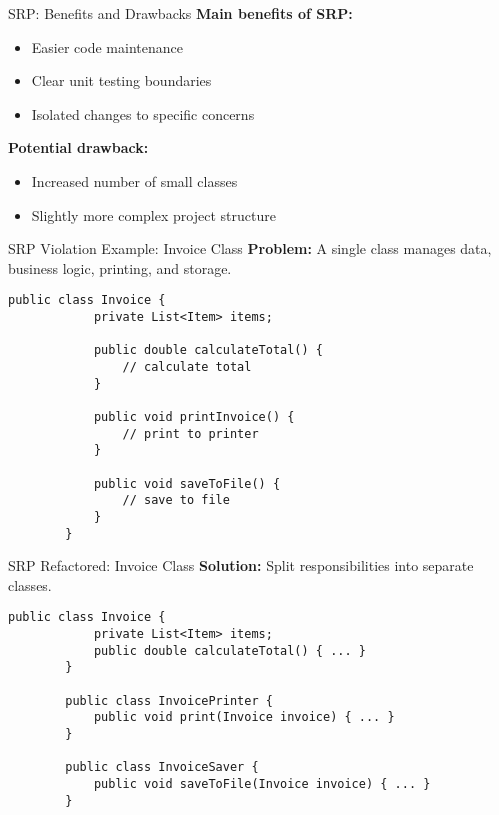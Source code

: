 \documentclass[aspectratio=169, table]{beamer}
\begin{document}
\begin{frame}[fragile]{SRP: Benefits and Drawbacks}
	\vspace{20pt}
	\textbf{Main benefits of SRP:}
	\begin{itemize}
		\item Easier code maintenance
		\item Clear unit testing boundaries
		\item Isolated changes to specific concerns
	\end{itemize}
	
	\textbf{Potential drawback:}
	\begin{itemize}
		\item Increased number of small classes
		\item Slightly more complex project structure
	\end{itemize}
\end{frame}

\begin{frame}[fragile]{SRP Violation Example: Invoice Class}
	\vspace{20pt}
	\textbf{Problem:} A single class manages data, business logic, printing, and storage.
	\begin{lstlisting}[style=JavaStyle]
		public class Invoice {
			private List<Item> items;
			
			public double calculateTotal() {
				// calculate total
			}
			
			public void printInvoice() {
				// print to printer
			}
			
			public void saveToFile() {
				// save to file
			}
		}
	\end{lstlisting}
\end{frame}

\begin{frame}[fragile]{SRP Refactored: Invoice Class}
	\vspace{20pt}
	\textbf{Solution:} Split responsibilities into separate classes.
	\begin{lstlisting}[style=JavaStyle]
		public class Invoice {
			private List<Item> items;
			public double calculateTotal() { ... }
		}
		
		public class InvoicePrinter {
			public void print(Invoice invoice) { ... }
		}
		
		public class InvoiceSaver {
			public void saveToFile(Invoice invoice) { ... }
		}
	\end{lstlisting}
\end{frame}
\end{document}
